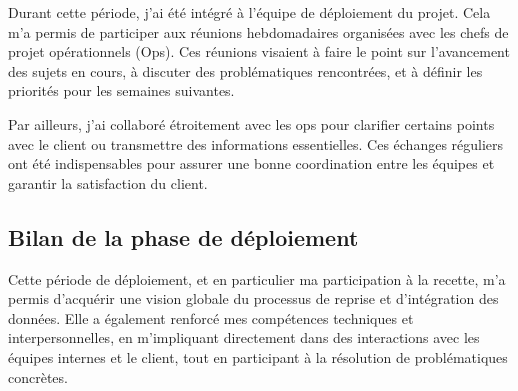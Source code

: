 Durant cette période, j’ai été intégré à l’équipe de déploiement du projet. Cela m’a permis de participer aux réunions hebdomadaires organisées avec les chefs de projet opérationnels (Ops). Ces réunions visaient à faire le point sur l’avancement des sujets en cours, à discuter des problématiques rencontrées, et à définir les priorités pour les semaines suivantes.

Par ailleurs, j’ai collaboré étroitement avec les ops pour clarifier certains points avec le client ou transmettre des informations essentielles. Ces échanges réguliers ont été indispensables pour assurer une bonne coordination entre les équipes et garantir la satisfaction du client.

\subsection{Bilan de la phase de déploiement}

Cette période de déploiement, et en particulier ma participation à la recette, m’a permis d’acquérir une vision globale du processus de reprise et d’intégration des données. Elle a également renforcé mes compétences techniques et interpersonnelles, en m’impliquant directement dans des interactions avec les équipes internes et le client, tout en participant à la résolution de problématiques concrètes.



